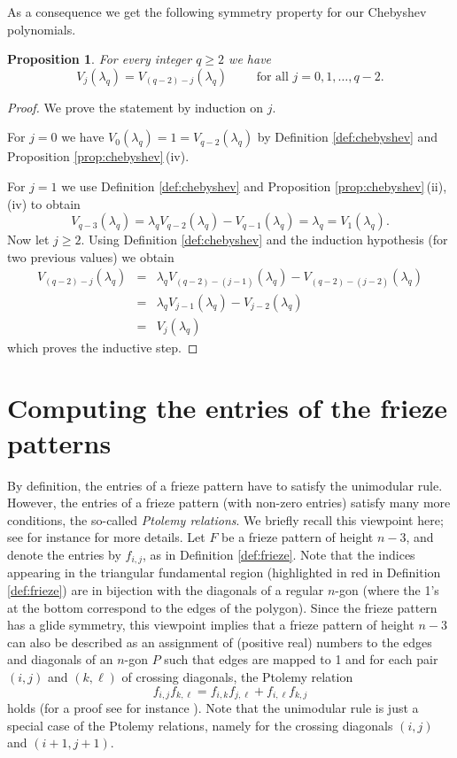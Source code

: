 \documentclass[11pt,a4paper]{amsart}
\newtheorem{Proposition}[Lemma]{Proposition}
\theoremstyle{definition}
\numberwithin{equation}{section}
\begin{document}
As a consequence we get the following symmetry property for our Chebyshev polynomials.

\begin{Proposition} \label{prop:symmetry}
For every integer $q\ge 2$ we have
$$V_j(\lambda_q) = V_{(q-2)-j}(\lambda_q)\mbox{~~~~~~~for all $j=0,1,\ldots,q-2$}.
$$
\end{Proposition}

\begin{proof}
We prove the statement by induction on $j$. 

For $j=0$ we have
$V_0(\lambda_q) = 1 = V_{q-2}(\lambda_q)$
by Definition \ref{def:chebyshev} and Proposition \ref{prop:chebyshev}\,(iv).

For $j=1$ we use Definition \ref{def:chebyshev} and Proposition \ref{prop:chebyshev}\,(ii),(iv) to obtain
$$V_{q-3}(\lambda_q) = \lambda_q V_{q-2}(\lambda_q) - V_{q-1}(\lambda_q) = \lambda_q = V_1(\lambda_q).
$$ 
Now let $j\ge 2$. Using Definition \ref{def:chebyshev} and the induction hypothesis (for two previous values) we obtain 
\begin{eqnarray*}
V_{(q-2)-j}(\lambda_q) & = & \lambda_q V_{(q-2)-(j-1)}(\lambda_q) - V_{(q-2)-(j-2)}(\lambda_q) \\
& = & \lambda_q V_{j-1}(\lambda_q) - V_{j-2}(\lambda_q) \\
& = & V_j(\lambda_q)
\end{eqnarray*}
which proves the inductive step. 
\end{proof}



\section{Computing the entries of the frieze patterns} \label{sec:algorithm}

By definition, the entries of a frieze pattern have to satisfy the unimodular rule. However, the entries of 
a frieze pattern (with non-zero entries) 
satisfy many more conditions, the so-called {\em Ptolemy relations}. We briefly recall
this viewpoint here; see for instance \cite[Section 2]{HJ17} for more details.  
Let $F$ be a frieze pattern of height $n-3$, and denote the entries by $f_{i,j}$, as in Definition \ref{def:frieze}. 
Note that the indices appearing in the triangular fundamental region (highlighted in red in Definition \ref{def:frieze})
are in bijection with the diagonals of a regular $n$-gon (where the 1's at the bottom correspond to the 
edges of the polygon). Since the frieze pattern has a glide symmetry, this viewpoint implies that 
a frieze pattern of height $n-3$ can also be described as an assignment of (positive real) numbers
to the edges and diagonals of an $n$-gon $P$ such that edges are mapped to 1 and for each pair $(i,j)$ and $(k,\ell)$ of crossing diagonals, the Ptolemy relation 
$$f_{i,j}f_{k,\ell} = f_{i,k}f_{j,\ell} + f_{i,\ell}f_{k,j}
$$
holds (for a proof see for instance \cite[Theorem 3.3]{CHJ20}).
Note that the unimodular rule is just a special case of the Ptolemy relations, namely for the crossing diagonals
$(i,j)$ and $(i+1,j+1)$. 
\smallskip
\end{document}
